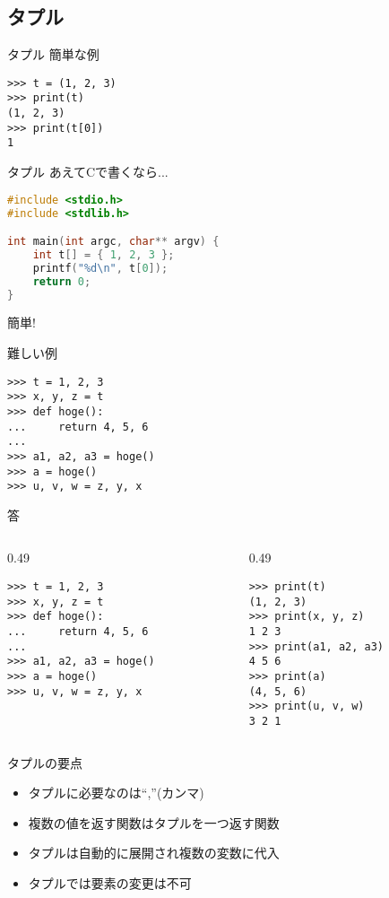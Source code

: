 \documentclass[12pt, xetex, xcolor=pdftex, dvipsnames]{beamer}
\begin{document}
\subsection{タプル}
\begin{frame}[fragile]{タプル}
    簡単な例
    \begin{lstlisting}
>>> t = (1, 2, 3)
>>> print(t)
(1, 2, 3)
>>> print(t[0])
1
    \end{lstlisting}
\end{frame}
\begin{frame}[fragile]{タプル}
    あえてCで書くなら...
    \begin{lstlisting}[language={C}]
#include <stdio.h>
#include <stdlib.h>

int main(int argc, char** argv) {
    int t[] = { 1, 2, 3 };
    printf("%d\n", t[0]);
    return 0;
}
    \end{lstlisting}
    簡単!
\end{frame}
\begin{frame}[fragile]{難しい例}
\begin{lstlisting}
>>> t = 1, 2, 3
>>> x, y, z = t
>>> def hoge():
...     return 4, 5, 6
...
>>> a1, a2, a3 = hoge()
>>> a = hoge()
>>> u, v, w = z, y, x
\end{lstlisting}
\end{frame}
\begin{frame}[fragile]{答}
    \begin{columns}[t]
        \begin{column}{0.49\hsize}
\begin{lstlisting}
>>> t = 1, 2, 3
>>> x, y, z = t
>>> def hoge():
...     return 4, 5, 6
...
>>> a1, a2, a3 = hoge()
>>> a = hoge()
>>> u, v, w = z, y, x
\end{lstlisting}
        \end{column}
        \begin{column}{0.49\hsize}
\begin{lstlisting}
>>> print(t)
(1, 2, 3)
>>> print(x, y, z)
1 2 3
>>> print(a1, a2, a3)
4 5 6
>>> print(a)
(4, 5, 6)
>>> print(u, v, w)
3 2 1
\end{lstlisting}
        \end{column}
    \end{columns}
\end{frame}
\begin{frame}{タプルの要点}
    \begin{itemize}
        \item タプルに必要なのは``,''(カンマ)
        \item 複数の値を返す関数はタプルを一つ返す関数
        \item タプルは自動的に展開され複数の変数に代入
        \item \alert{タプルでは要素の変更は不可}
    \end{itemize}
\end{frame}
\end{document}
